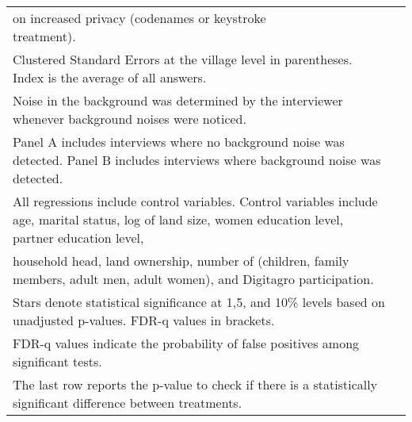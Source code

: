 \begin{tabular}{l*{8}{c}}
{on increased privacy (codenames or keystroke treatment).} \\ \multicolumn{8}{l}{\tiny Clustered Standard Errors at the village level in parentheses. Index is the average of all answers.} \\\multicolumn{8}{l}{\tiny Noise in the background was determined by the interviewer whenever background noises were noticed.} \\ \multicolumn{8}{l}{\tiny Panel A includes interviews where no background noise was detected. Panel B includes interviews where background noise was detected. } \\ \multicolumn{8}{l}{\tiny All regressions include control variables. Control variables include age, marital status, log of land size, women education level, partner education level, } \\ \multicolumn{8}{l}{\tiny household head, land ownership, number of (children, family members, adult men, adult women), and Digitagro participation.} \\  \multicolumn{8}{l}{\tiny Stars denote statistical significance at 1,5, and 10\% levels based on unadjusted p-values. FDR-q values in brackets.} \\ \multicolumn{8}{l}{\tiny FDR-q values indicate the probability of false positives among significant tests.} \\ \multicolumn{8}{l}{\tiny The last row reports the p-value to check if there is a statistically significant difference between treatments. } \\  \hline\hline \end{tabular}
